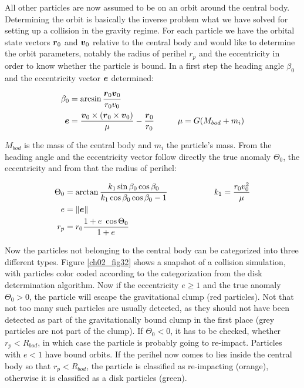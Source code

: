 All other particles are now assumed to be on an orbit around the central body. Determining the orbit is basically the inverse problem what we have solved for setting up a collision in the gravity regime. For each particle we have the orbital state vectors $\boldsymbol{r}_0$ and $\boldsymbol{v}_0$ relative to the central body and would like to determine the orbit parameters, notably the radius of perihel $r_p$ and the eccentricity in order to know whether the particle is bound. In a first step the heading angle $\beta_0$ and the eccentricity vector $\boldsymbol{e}$ determined:

\begin{align}
\label{ch02_aux_eq016}
\beta_0 &= \arcsin{\frac{\boldsymbol{r}_0 \boldsymbol{v}_0}{r_0 v_0}} \\
\boldsymbol{e} &=  \frac{\boldsymbol{v}_0 \times (\boldsymbol{r}_0 \times \boldsymbol{v}_0) }{\mu} - \frac{\boldsymbol{r}_0}{r_0} \hspace{1.0cm} \mu = G (M_{bod} + m_i)
\end{align}

$M_{bod}$ is the mass of the central body and $m_i$ the particle's mass. From the heading angle and the eccentricity vector follow directly the true anomaly $\Theta_0$, the eccentricity and from that the radius of perihel:

\begin{align}
\label{ch02_aux_eq017}
\Theta_0 &= \arctan{\frac{k_1 \sin{\beta_0} \cos{\beta_0}}{k_1 \cos{\beta_0} \cos{\beta_0} - 1} } \hspace{2.0cm} k_1 = \frac{r_0 v_0^2}{\mu} \\
e &= \| \ev \| \\
r_p &= r_0 \frac{1 + e \cos{\Theta_0} }{1 + e}
\end{align}

Now the particles not belonging to the central body can be categorized into three different types. Figure \ref{ch02_fig32} shows a snapshot of a collision simulation, with particles color coded according to the categorization from the disk determination algorithm. Now if the eccentricity $e \ge 1$ and the true anomaly $\Theta_0 > 0$, the particle will escape the gravitational clump (red particles). Not that not too many such particles are usually detected, as they should not have been detected as part of the gravitationally bound clump in the first place (grey particles are not part of the clump). If $\Theta_0 < 0$, it has to be checked, whether $r_p < R_{bod}$, in which case the particle is probably going to re-impact. Particles with $e < 1$ have bound orbits. If the perihel now comes to lies inside the central body so that $r_p < R_{bod}$, the particle is classified as re-impacting (orange), otherwise it is classified as a disk particles (green). 

